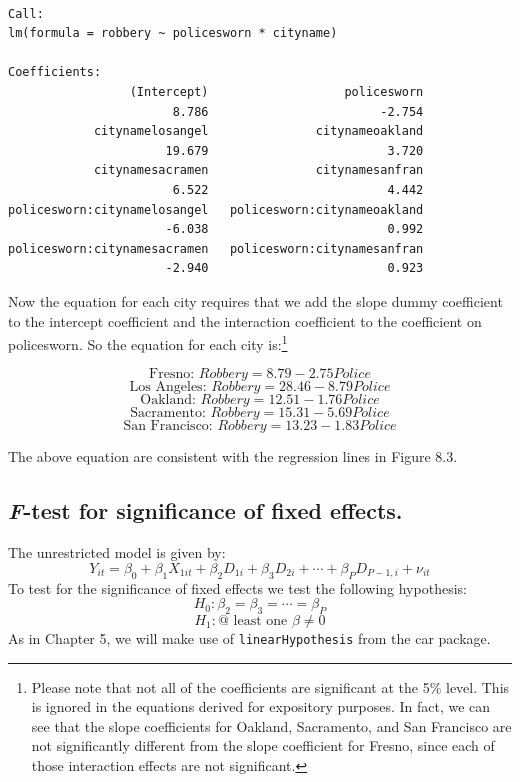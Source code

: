 \documentclass[]{book}
\let\rmarkdownfootnote\footnote%
\def\footnote{\protect\rmarkdownfootnote}
\begin{document}
\begin{verbatim}

Call:
lm(formula = robbery ~ policesworn * cityname)

Coefficients:
                 (Intercept)                   policesworn  
                       8.786                        -2.754  
            citynamelosangel               citynameoakland  
                      19.679                         3.720  
            citynamesacramen               citynamesanfran  
                       6.522                         4.442  
policesworn:citynamelosangel   policesworn:citynameoakland  
                      -6.038                         0.992  
policesworn:citynamesacramen   policesworn:citynamesanfran  
                      -2.940                         0.923  
\end{verbatim}

Now the equation for each city requires that we add the slope dummy coefficient to the intercept coefficient and the interaction coefficient to the coefficient on policesworn. So the equation for each city is:\footnote{Please note that not all of the coefficients are significant at the 5\% level. This is ignored in the equations derived for expository purposes. In fact, we can see that the slope coefficients for Oakland, Sacramento, and San Francisco are not significantly different from the slope coefficient for Fresno, since each of those interaction effects are not significant.}

\[\text{Fresno: }Robbery = 8.79-2.75Police\]
\[\text{Los Angeles: }Robbery=28.46-8.79Police\]
\[\text{Oakland: }Robbery=12.51-1.76Police\]
\[\text{Sacramento: }Robbery=15.31-5.69Police\]
\[\text{San Francisco: }Robbery=13.23-1.83Police\]

The above equation are consistent with the regression lines in Figure 8.3.

\hypertarget{f-test-for-significance-of-fixed-effects.}{%
\subsection{\texorpdfstring{\emph{F}-test for significance of fixed effects.}{F-test for significance of fixed effects.}}\label{f-test-for-significance-of-fixed-effects.}}

The unrestricted model is given by:\[Y_{it}=\beta_0+\beta_1X_{1it}+\beta_2D_{1i}+\beta_3D_{2i}+\cdots+\beta_PD_{P-1,i}+\nu_{it}\] To test for the significance of fixed effects we test the following hypothesis: \[H_0:\beta_2=\beta_3=\cdots=\beta_P\] \[H_1: \text{@ least one }\beta\ne0\] As in Chapter 5, we will make use of \texttt{linearHypothesis} from the car package.
\end{document}
